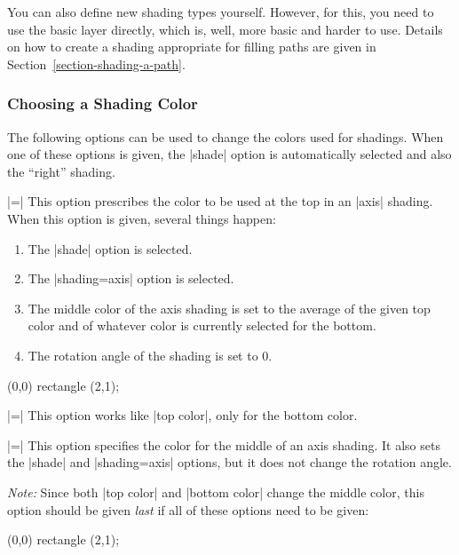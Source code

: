 You can also define new shading types yourself. However, for this, you
need to use the basic layer directly, which is, well, more basic and
harder to use. Details on how to create a shading appropriate for
filling paths are given in Section~\ref{section-shading-a-path}.



\subsubsection{Choosing a Shading Color}

The following options can be used to change the colors used for
shadings. When one of these options is given, the |shade| option is
automatically selected and also the ``right'' shading.

\begin{itemize}
  |=|
  This option prescribes the color to be used at the top in an |axis|
  shading. When this option is given, several things happen:
  \begin{enumerate}
  \item
    The |shade| option is selected.
  \item
    The |shading=axis| option is selected.
  \item
    The middle color of the axis shading is set to the average of the
    given top color  and of whatever color is currently
    selected for the bottom.
  \item
    The rotation angle of the shading is set to 0.
  \end{enumerate}

\begin{codeexample}[]
\tikz \draw[top color=red] (0,0) rectangle (2,1);
\end{codeexample}
  
  |=|
  This option works like |top color|, only for the bottom color.
  
  |=|
  This option specifies the color for the middle of an axis
  shading. It also sets the |shade| and |shading=axis| options, but it
  does not change the rotation angle.

  \emph{Note:} Since both |top color| and |bottom color| change the
  middle color, this option should be given \emph{last} if all of
  these options need to be given:

\begin{codeexample}[]
\tikz \draw[top color=white,bottom color=black,middle color=red]
  (0,0) rectangle (2,1);
\end{codeexample}  


\end{itemize}
